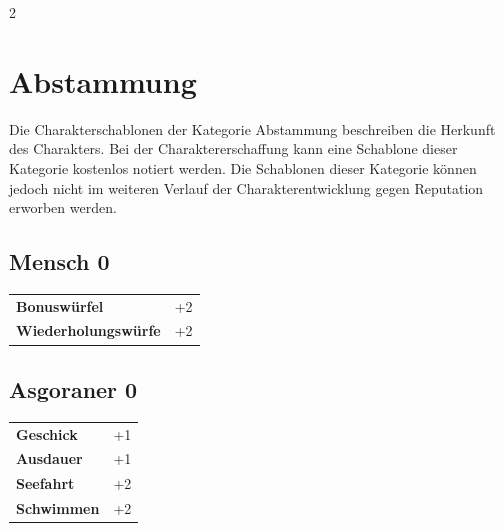 \label{ch:appendix-templates}

\begin{multicols}{2}

\section{Abstammung}

Die Charakterschablonen der Kategorie Abstammung beschreiben die Herkunft des Charakters. Bei der Charaktererschaffung kann eine Schablone dieser Kategorie kostenlos notiert werden. Die Schablonen dieser Kategorie können jedoch nicht im weiteren Verlauf der Charakterentwicklung gegen Reputation erworben werden.

\begin{tcolorbox}
    \subsection*{Mensch \hfill \small{0 }}
    \tcblower




\begin{tabular}{@{}ll@{}}
    \textbf{Bonuswürfel} & +2\\
    \textbf{Wiederholungswürfe} & +2\\
\end{tabular}


\end{tcolorbox}

\begin{tcolorbox}
    \subsection*{Asgoraner \hfill \small{0 }}
    \tcblower




\begin{tabular}{@{}ll@{}}
    \textbf{Geschick} & +1\\
    \textbf{Ausdauer} & +1\\
    \textbf{Seefahrt} & +2\\
    \textbf{Schwimmen} & +2\\
\end{tabular}


\end{tcolorbox}
\end{multicols}
